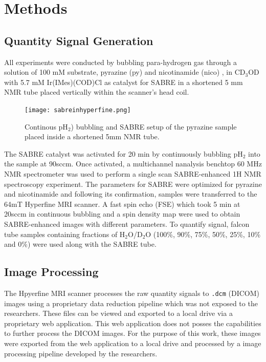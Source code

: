 \documentclass[final,3p,times,twocolumn]{elsarticle}
\begin{document}
\section{Methods}

\subsection{Quantity Signal Generation}

All experiments were conducted by bubbling para-hydrogen gas through a solution of 100 mM substrate, pyrazine (py) and nicotinamide (nico) , in CD$_{\mathrm{3}}$OD with 5.7 mM
Ir(IMes)(COD)Cl as catalyst for SABRE in a shortened 5 mm NMR tube placed vertically within the scanner’s head coil. 
\begin{figure}
    \centering
    \texttt{[image: sabreinhyperfine.png]}
    \caption{Continous pH$_{\mathrm{2}}$) bubbling and SABRE setup of the pyrazine sample placed inside a shortened 5mm NMR tube.}
    \label{fig:my_label}
\end{figure}

The SABRE catalyst was activated for 20 min by continuously bubbling pH$_{\mathrm{2}}$ into the sample at 90sccm. Once activated, a multichannel nanalysis benchtop 60 MHz NMR spectrometer was used to perform a single scan SABRE-enhanced 1H NMR spectroscopy experiment. The parameters for SABRE were optimized for pyrazine and nicotinamide and following its confirmation, samples were transferred to the 64mT Hyperfine MRI scanner. 
A fast spin echo (FSE) which took 5 min at 20sccm in continuous bubbling and a spin density map were used to obtain SABRE-enhanced images with different parameters. To quantify signal, falcon tube samples containing fractions of H$_{\mathrm{2}}$O/D$_{\mathrm{2}}$O (100\%, 90\%, 75\%, 50\%, 25\%, 10\% and 0\%) were used along with the SABRE tube.

\subsection{Image Processing}

The Hpyerfine  MRI scanner processes the raw quantity signals to \texttt{.dcm} (DICOM) images using a proprietary data reduction pipeline which was not exposed to the researchers. These files can be viewed and exported to a local drive via a proprietary web application. This web application does not posses the capabilities to further process the DICOM images. For the purpose of this work, these images were exported from the web application to a local drive and processed by a image processing pipeline developed by the researchers. 
\end{document}
